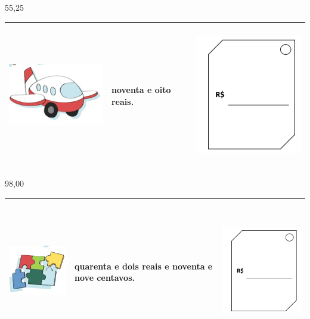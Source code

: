 55,25

\begin{longtable}[]{@{}lll@{}}
\toprule
\includegraphics[width=1.96902in,height=1.29185in]{media/image58.png} &
noventa e oito reais. &
\includegraphics[width=2.19822in,height=2.44826in]{media/image56.png}\tabularnewline
\bottomrule
\end{longtable}

98,00

\begin{longtable}[]{@{}lll@{}}
\toprule
\includegraphics[width=1.60439in,height=1.38561in]{media/image59.png} &
quarenta e dois reais e noventa e nove centavos. &
\includegraphics[width=2.19822in,height=2.44826in]{media/image56.png}\tabularnewline
\bottomrule
\end{longtable}

